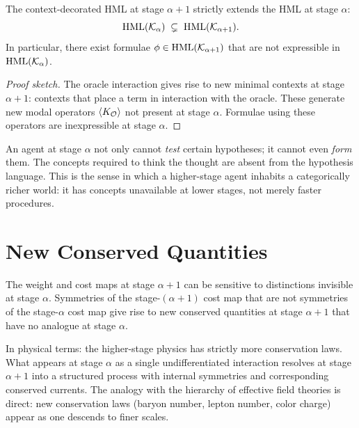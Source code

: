 \begin{proposition}
The context-decorated HML at stage $\alpha+1$ strictly extends
the HML at stage $\alpha$:
\[
  \mathrm{HML}(\mathcal{K}_\alpha) \;\subsetneq\; \mathrm{HML}(\mathcal{K}_{\alpha+1}).
\]
In particular, there exist formulae $\phi \in \mathrm{HML}(\mathcal{K}_{\alpha+1})$
that are not expressible in $\mathrm{HML}(\mathcal{K}_\alpha)$.
\end{proposition}

\begin{proof}[Proof sketch]
The oracle interaction gives rise to new minimal contexts at stage
$\alpha+1$: contexts that place a term in interaction with the
oracle.
These generate new modal operators $\langle K_{\mathcal{O}} \rangle$
not present at stage $\alpha$.
Formulae using these operators are inexpressible at stage $\alpha$.
\end{proof}

\begin{remark}
An agent at stage $\alpha$ not only cannot \emph{test} certain
hypotheses; it cannot even \emph{form} them.
The concepts required to think the thought are absent from the
hypothesis language.
This is the sense in which a higher-stage agent inhabits a
categorically richer world: it has concepts unavailable at lower
stages, not merely faster procedures.
\end{remark}

\section{New Conserved Quantities}

\begin{proposition}
\label{prop:new-noether}
The weight and cost maps at stage $\alpha+1$ can be sensitive to
distinctions invisible at stage $\alpha$.
Symmetries of the stage-$(\alpha+1)$ cost map that are not
symmetries of the stage-$\alpha$ cost map give rise to new
conserved quantities at stage $\alpha+1$ that have no analogue
at stage $\alpha$.
\end{proposition}

\begin{remark}
In physical terms: the higher-stage physics has strictly more
conservation laws.
What appears at stage $\alpha$ as a single undifferentiated
interaction resolves at stage $\alpha+1$ into a structured process
with internal symmetries and corresponding conserved currents.
The analogy with the hierarchy of effective field theories is
direct: new conservation laws (baryon number, lepton number,
color charge) appear as one descends to finer scales.
\end{remark}

